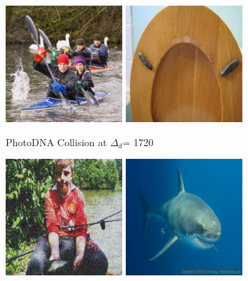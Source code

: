 \documentclass[letterpaper]{article}
\newcommand{\maxdist}{\ensuremath{{\Delta_d}}}
\begin{document}
\begin{figure}[t]
    \centering
    \begin{subfigure}[t]{0.48\linewidth}
    \includegraphics[width=0.48\textwidth]{figures/colgen_pdna_diff_1015.png}
    \includegraphics[width=0.48\textwidth]{figures/colgen_pdna_diff_target.png}
    \caption{PhotoDNA Collision at \maxdist = 1720}
    \label{fig:intro:fuzzy-gen:pdna}
    \end{subfigure}
    \begin{subfigure}[t]{0.48\linewidth}
    \includegraphics[width=0.48\textwidth]{figures/colgen_imgnet_pdq_boy2shark_250.png}
    \includegraphics[width=0.48\textwidth]{figures/colgen_imgnet_pdq_boy2shark_target.png}

\end{subfigure}
\end{figure}
\end{document}
